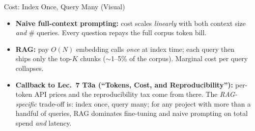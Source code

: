 \begin{frame}{Cost: Index Once, Query Many (Visual)}
\begin{center}
\end{center}

\medskip
\begin{itemize}
\item \textbf{Naive full-context prompting:} cost scales \emph{linearly} with both context size \emph{and} \# queries. Every question repays the full corpus token bill.
\item \textbf{RAG:} pay $O(N)$ embedding calls \emph{once} at index time; each query then ships only the top-$K$ chunks ($\sim$1--5\% of the corpus). Marginal cost per query collapses.
\item \textbf{Callback to Lec.\ 7 T3a (``Tokens, Cost, and Reproducibility''):} per-token API prices and the reproducibility tax come from there. The \emph{RAG-specific} trade-off is: index once, query many; for any project with more than a handful of queries, RAG dominates fine-tuning and naive prompting on total spend \emph{and} latency.
\end{itemize}
\end{frame}

